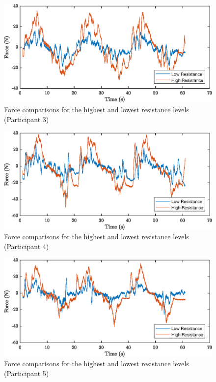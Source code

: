 \documentclass[12pt]{report}
\begin{document}
\begin{figure}[h] 
	\centering
	\includegraphics[width=\linewidth]{force3}
	\caption{Force comparisons for the highest and lowest resistance levels (Participant 3)}
	\label{fig:force3}
\end{figure}

\begin{figure}[h] 
	\centering
	\includegraphics[width=\linewidth]{force4}
	\caption{Force comparisons for the highest and lowest resistance levels (Participant 4)}
	\label{fig:force4}
\end{figure}

\begin{figure}[h] 
	\centering
	\includegraphics[width=\linewidth]{force5}
	\caption{Force comparisons for the highest and lowest resistance levels (Participant 5)}
	\label{fig:force5}
\end{figure}
\end{document}
